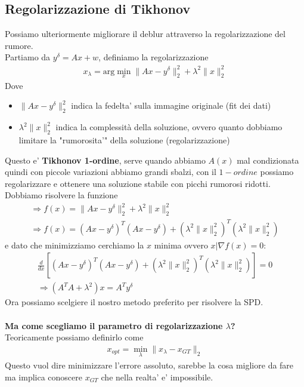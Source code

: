\documentclass[a4paper,12pt]{article}
\begin{document}
\subsection*{Regolarizzazione di Tikhonov}
Possiamo ulteriormente migliorare il deblur attraverso la regolarizzazione del rumore. \\
Partiamo da $y^\delta = Ax+w$, definiamo la regolarizzazione
\begin{align*}
    x_\lambda = \text{arg} \min_x \| Ax - y^\delta \|_2^2 + \lambda^2 \| x \|_2^2
\end{align*}
Dove 
\begin{itemize}
    \item $\| Ax - y^\delta \|_2^2$ indica la fedelta' sulla immagine originale (fit dei dati)
    \item $\lambda^2 \| x \|_2^2$ indica la complessità della soluzione, ovvero quanto dobbiamo limitare la "rumorosita'" della soluzione (regolarizzazione)
\end{itemize}
Questo e' \textbf{Tikhonov 1-ordine}, serve quando abbiamo $A(x)$ mal condizionata quindi con piccole variazioni abbiamo grandi sbalzi, con il $1-ordine$ possiamo regolarizzare e ottenere una soluzione stabile con picchi rumorosi ridotti. \\
Dobbiamo risolvere la funzione
\begin{align*}
    \Rightarrow f(x) = \| Ax - y^\delta \|_2^2 + \lambda^2 \| x \|_2^2 \\
    \Rightarrow f(x) = (Ax - y^\delta)^T(Ax - y^\delta)+(\lambda^2 \| x \|_2^2 )^T(\lambda^2 \| x \|_2^2 )
\end{align*}
e dato che minimizziamo cerchiamo la $x$ minima ovvero $x | \nabla f(x)=0$:
\begin{align*}
    \frac{d}{dx}[(Ax - y^\delta)^T(Ax - y^\delta)+(\lambda^2 \| x \|_2^2 )^T(\lambda^2 \| x \|_2^2 )] = 0\\
    \Rightarrow (A^TA + \lambda^2)x = A^T y^\delta
\end{align*}
Ora possiamo scelgiere il nostro metodo preferito per risolvere la SPD.\\
\vspace{2em}\\
\textbf{Ma come scegliamo il parametro di regolarizzazione $\lambda$?}\\
Teoricamente possiamo definirlo come 
\begin{align*}
    x_{opt} = \min_\lambda \|x_\lambda - x_{GT} \|_2
\end{align*}
Questo vuol dire minimizzare l'errore assoluto, sarebbe la cosa migliore da fare ma implica conoscere $x_{GT}$ che nella realta' e' impossibile. \\
\end{document}
